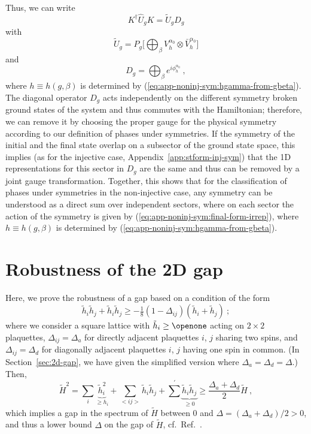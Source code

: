 \documentclass[twocolumn,superscriptaddress,prb,linenumbers]{revtex4-1}
\begin{document}
Thus, we can write
\[
    K^\dagger \hat U_g K = \tilde U_g D_g
\]
with
\begin{equation}
    \label{eq:app-noninj-sym:final-form-irrep}
    \tilde U_g =
    P_g\bigg[\bigoplus_\beta V^{\alpha_0}_h\otimes\bar V^{\alpha_0}_h \bigg]
\end{equation}
and
\begin{equation}
    \label{eq:app-noninj-sym:diagonal-part-irrep}
    D_g = \bigoplus_\beta e^{i\phi_h^{\alpha_0}}\ ,
\end{equation}
where $h\equiv h(g,\beta)$ is determined by
(\ref{eq:app-noninj-sym:hgamma-from-gbeta}).
The diagonal operator $D_g$ acts independently on the different symmetry
broken ground states of the system and thus commutes with the Hamiltonian;
therefore, we can remove it by choosing the proper gauge for the physical
symmetry according to our definition of phases under symmetries.  If the
symmetry of the initial and the final state overlap on a subsector of the
ground state space, this implies (as for the injective case,
Appendix~\ref{app:stform-inj-sym}) that the 1D representations for this
sector in $D_g$ are the same and thus can be removed by a joint gauge
transformation.  Together, this shows that for the classification of
phases under symmetries in the non-injective case, any symmetry can be
understood as a direct sum over independent sectors, where on each sector
the action of the symmetry is given by
(\ref{eq:app-noninj-sym:final-form-irrep}), where $h\equiv h(g,\beta)$ is
determined by (\ref{eq:app-noninj-sym:hgamma-from-gbeta}).



\section{\label{appendix:gap}
  Robustness of the 2D gap}


Here, we prove the robustness of a gap based on a condition of the form
\begin{equation}
    \label{eq:com-gap}
    \tilde h_i \tilde h_j+\tilde h_i \tilde h_j
    \ge -\tfrac18(1-\Delta_{ij}) (\tilde h_i+\tilde h_j)\ ;
\end{equation}
where we consider a square lattice with $\tilde h_i\ge\openone$ acting on
$2\times 2$ plaquettes, $\Delta_{ij}=\Delta_a$ for directly adjacent
plaquettes $i$, $j$ sharing two spins, and $\Delta_{ij}=\Delta_d$ for
diagonally adjacent plaquettes $i$, $j$ having one spin in common. (In
Section~\ref{sec:2d-gap}, we have given the simplified version where
$\Delta_a=\Delta_d=\Delta$.) Then,
\[
    \tilde H^2=
    \sum_i \underbrace{\tilde h_i^2}_{\ge h_i} +
    \sum_{<ij>} \tilde h_i \tilde h_j +
    {\sum}^\prime \underbrace{\tilde h_i \tilde h_j}_{\ge0}
    \ge \frac{\Delta_a+\Delta_d}{2} \tilde H
    \ ,
\]
which implies a gap in the spectrum of $\tilde H$ between $0$ and
$\Delta=(\Delta_a+\Delta_d)/2>0$, and thus a lower bound $\Delta$ on the
gap of $\tilde H$, cf.~Ref.~.
\end{document}
